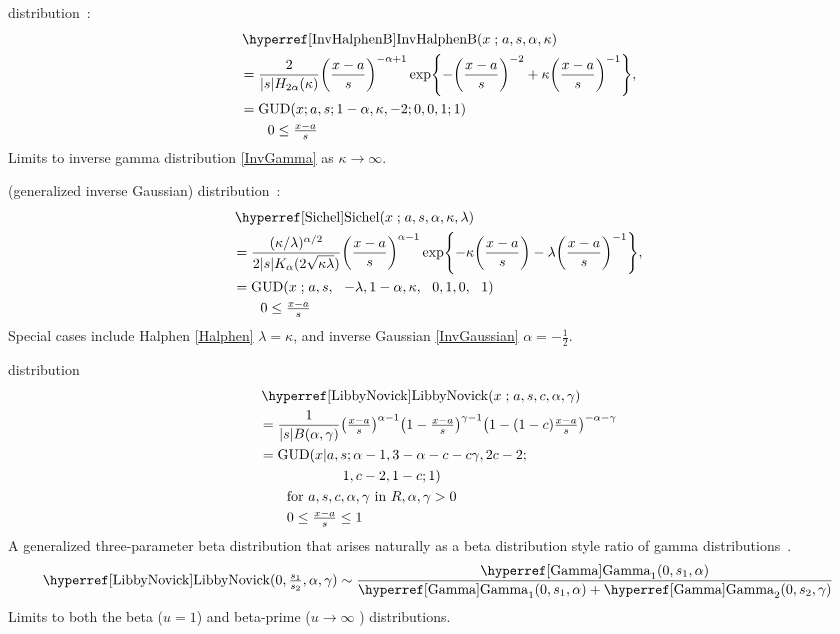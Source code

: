  distribution~\cite{Morlat1956a,Perreault1999}:
\begin{align}
\label{InvHalphenB}
&\opr{InvHalphenB}(x\given a,s, \alpha, \kappa) 
\\
&= \frac{2}{|s| H_{2\alpha}(\kappa)} \Left(\frac{x-a}{s}\Right)^{-\alpha+1} 
\exp\Left\{- \Left(\frac{x-a}{s}\Right)^{-2} +\kappa \Left(\frac{x-a}{s}\Right)^{-1}\Right\},
\checked
\notag
\\
& = \op{GUD}(x ; a,s; 1-\alpha, \kappa,  -2; 0,0,1;1) \checked
\notag
\\& \qquad  0 \leq \tfrac{x-a}{s}
\notag
\end{align}
Limits to inverse gamma distribution \eqref{InvGamma} as $\kappa \rightarrow \infty$.

 (generalized inverse Gaussian) distribution~\cite{Good1953, Sichel1973, Barndorff-Nielsen1977}:
\begin{align}
\label{Sichel}
&\opr{Sichel}(x\given a,s, \alpha, \kappa, \lambda) 
\\
&= \frac{(\kappa/\lambda)^{\alpha/2} }{2 |s| K_{\alpha} (2\sqrt{\kappa\lambda})} \Left(\frac{x-a}{s}\Right)^{\alpha-1} 
\exp\Left\{-\kappa \Left(\frac{x-a}{s}\Right) -\lambda \Left(\frac{x-a}{s}\Right)^{-1}\Right\},
\notag
\checked
\\
& = \op{GUD}(x \given a,s \sep -\lambda, 1-\alpha , \kappa \sep 0,1,0 \sep 1)
\notag
\\& \qquad  0 \leq \tfrac{x-a}{s} \notag
\end{align}
Special cases include Halphen \eqref{Halphen} $\lambda= \kappa$, and inverse Gaussian \eqref{InvGaussian} $\alpha = -\tfrac{1}{2}$.




 distribution~\cite{Libby1982a, McDonald1995, Sarabia2006, Nadarajah2007}
\begin{align}
\label{LibbyNovick}
&\opr{LibbyNovick}(x\given a,s,c,\alpha,\gamma) 
\\ \notag
&=  \frac{1}{|s| B(\alpha,\gamma)}
\Left(\tfrac{x-a}{s}\Right)^{\alpha-1}  \Left(1-\tfrac{x-a}{s}\Right)^{\gamma-1} \Left(1- (1-c) \tfrac{x-a}{s}\Right)^{-\alpha-\gamma}
\checked
\notag
\\ \notag
& = \op{GUD}(x|a,s; \alpha-1, 3-\alpha - c - c\gamma, 2c-2; 
\\ \notag & \qquad\qquad\qquad 1, c-2, 1-c;1) \checked
\\ \notag
& \qquad \text{for } a,s,c,\alpha,\gamma  \text{ in } {R},  \alpha,\gamma  >0
\\ \notag
& \qquad 0\leq \tfrac{x-a}{s} \leq1
\end{align}
A generalized three-parameter beta distribution that arises naturally as a beta distribution style ratio of gamma distributions~\cite{Sarabia2006}. 
\[
\opr{LibbyNovick}(0, \tfrac{s_1}{s_2}, \alpha, \gamma) \sim \frac{\opr{Gamma}_1(0, s_1,\alpha)} { \opr{Gamma}_1(0, s_1,\alpha) + \opr{Gamma}_2(0, s_2,\gamma) }
\notag
\checked
\]
Limits to both the beta ($u=1$) and beta-prime ($u\rightarrow \infty$ ) distributions. 

